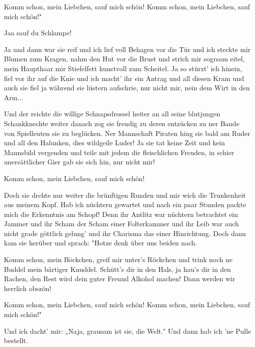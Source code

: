     \beginchorus\replay[chorus]
        Komm schon, mein Liebchen,
        sauf mich schön!
        Komm schon, mein Liebchen,
        sauf mich schön!"
    \endchorus

        Jaa sauf du Schlampe!

    \beginverse*\replay[bridge]
        Ja und dann war sie reif
        und ich lief voll Behagen
        vor die Tür
        und ich steckte mir Blumen zum Kragen,
        nahm den Hut vor die Brust
        und strich mir sogrsam eitel,
        mein Haupthaar mir Stiefelfett
        kunstvoll zum Scheitel.
        Ja so stürzt' ich hinein,
        fiel vor ihr auf die Knie
        und ich macht' ihr ein Antrag
        und all diesen Kram
        und auch sie fiel ja während
        sie lüstern aufschrie,
        nur nicht mir, nein dem Wirt in den Arm...
    \endverse

    \beginverse*\replay[bridge]
        Und der reichte die willige Schnapsdrossel heiter
        an all seine blutjungen Schankknechte weiter
        danach zog sie freudig
        zu deren entzücken
        zu ner Bande von Spielleuten
        sie zu beglücken.
        Ner Mannschaft Piraten
        hing sie bald am Ruder
        und all den Halunken,
        dies wildgeile Luder!
        Ja sie tat keine Zeit
        und kein Mannsbild vergeuden
        und teile mit jedem die fleischlichen Freuden,
        in schier unersättlicher Gier
        gab sie sich hin,
        nur nicht mir!
    \endverse

    \beginchorus\replay[chorus]
        Komm schon, mein Liebchen,
        sauf mich schön!
    \endchorus

    \beginverse*\replay[bridge]
        Doch sie drehte nur weiter
        die brünftigen Runden
        und mir wich die Trunkenheit
        aus meinem Kopf.
        Hab ich nüchtern gewartet
        und nach ein paar Stunden
        packte mich die Erkenntnis am Schopf!
        Denn ihr Antlitz war nüchtern betrachtet
        ein Jammer
        und ihr Scham
        der Scham einer Folterkammer
        und ihr Leib war auch
        nicht grade göttlich gelung'
        und ihr Charisma
        das einer Hinrichtung.
        Doch dann kam sie herüber und sprach:
        "Hotze denk über uns beiden nach.
    \beginchorus\replay[chorus]

    \beginverse*\replay[bridge]
        Komm schon, mein Böckchen,
        greif mir unter's Röckchen
        und trink noch ne Buddel
        mein bärtiger Knuddel.
        Schütt's dir in den Hals,
        ja hau's dir in den Rachen,
        den Rest wird dein guter Freund
        Alkohol machen!
        Dann werden wir herrlich obszön!
    \endverse

    \beginchorus\replay[chorus]
        Komm schon, mein Liebchen,
        sauf mich schön!
        Komm schon, mein Liebchen,
        sauf mich schön!"
    \endchorus

    \beginverse\replay[verse]
        Und ich dacht' mir:
        „Naja, grausam ist sie, die Welt."
        Und dann hab ich 'ne Pulle bestellt.
    \endverse
\endsong
